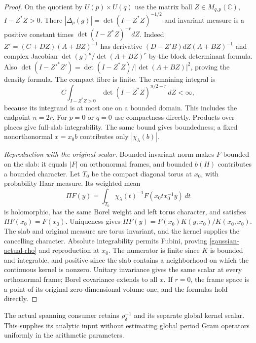 \begin{proof}
On the quotient by $U(p)\times U(q)$ use the matrix ball
$Z\in M_{q,p}(\mathbb C)$, $I-Z^*Z>0$. There
$|\Delta_p(g)|=\det(I-Z^*Z)^{-1/2}$ and invariant
measure is a positive constant times
$\det(I-Z^*Z)^{-r}dZ$.
Indeed $Z'=(C+DZ)(A+BZ)^{-1}$ has derivative
$(D-Z'B)dZ(A+BZ)^{-1}$ and complex Jacobian
$\det(g)^p/\det(A+BZ)^r$ by the block determinant formula.
Also $\det(I-Z'^*Z')=\det(I-Z^*Z)/|\det(A+BZ)|^2$,
proving the density formula. The compact fibre is finite.
The remaining integral is
\[
              C\int_{I-Z^*Z>0}\det(I-Z^*Z)^{n/2-r}\,dZ<\infty,
\]
because its integrand is at most one on a bounded domain.
This includes the endpoint $n=2r$.
For $p=0$ or $q=0$ use compactness directly.
Products over places give full-slab integrability.
The same bound gives boundedness; a fixed
nonorthonormal $x=x_0b$ contributes only
$|\chi_\lambda(b)|$.

\emph{Reproduction with the original scalar.}
Bounded invariant norm makes $F$ bounded on the slab:
it equals $|F|$ on orthonormal frames, and bounded
$b(H)$ contributes a bounded character.
Let $T_0$ be the compact diagonal torus at $x_0$, with
probability Haar measure. Its weighted mean
\[
 \Pi F(y)=\int_{T_0}\chi_\lambda(t)^{-1}
                                  F(x_0t x_0^{-1}y)\,dt
\]
is holomorphic, has the same Borel weight and left
torus character, and satisfies $\Pi F(x_0)=F(x_0)$.
Uniqueness gives
$\Pi F(y)=F(x_0)K(y,x_0)/K(x_0,x_0)$.
The slab and original measure are torus invariant,
and the kernel supplies the cancelling character.
Absolute integrability permits Fubini, proving
\eqref{gaussian-actual-rho} and reproduction at $x_0$.
The numerator is finite since $K$ is bounded and
integrable, and positive since the slab contains a
neighborhood on which the continuous kernel is nonzero.
Unitary invariance gives the same scalar at every
orthonormal frame; Borel covariance extends to all $x$.
If $r=0$, the frame space is a point of its original
zero-dimensional volume one, and the formulas hold directly.
\end{proof}

The actual spanning consumer retains $\rho_\delta^{-1}$
and its separate global kernel scalar. This supplies its
analytic input without estimating global period Gram
operators uniformly in the arithmetic parameters.

